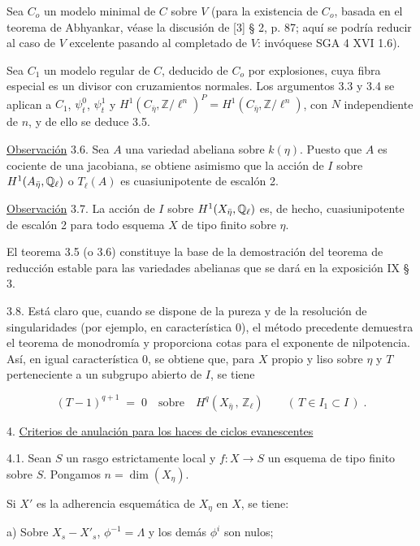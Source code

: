 Sea $C_o$ un modelo minimal de $C$ sobre $V$ (para la existencia de $C_o$, basada en el teorema de Abhyankar, véase la discusión de [3] § 2, p. 87; aquí se podría reducir al caso de $V$ excelente pasando al completado de $V$: invóquese SGA 4 XVI 1.6).

Sea $C_1$ un modelo regular de $C$, deducido de $C_o$ por explosiones, cuya fibra especial es un divisor con cruzamientos normales. Los argumentos 3.3 y 3.4 se aplican a $C_1$, $\psi_t^0$, $\psi_t^1$ y $H^1(C_{\bar\eta},\mathbb{Z}/\ell^n)^P = H^1(C_{\bar\eta},\mathbb{Z}/\ell^n)$, con $N$ independiente de $n$, y de ello se deduce 3.5.

\underline{Observación} 3.6.    Sea $A$ una variedad abeliana sobre $k(\eta)$. Puesto que $A$ es cociente de una jacobiana, se obtiene asimismo que la acción de $I$ sobre $H^1(\sisi{A_\eta}{A_{\bar\eta}},\mathbb{Q}_\ell)$ o $T_\ell(A)$ es cuasiunipotente de escalón 2.

\underline{Observación} 3.7.   La acción de $I$ sobre $H^1(X_{\bar\eta},\sisi{\mathbb{Q}}{\mathbb{Q}_\ell})$ es, de hecho, cuasiunipotente de escalón 2 para todo esquema $X$ de tipo finito sobre $\eta$.

El teorema 3.5 (o 3.6) constituye la base de la demostración del teorema de reducción estable para las variedades abelianas que se dará en la exposición IX § 3.

3.8.   Está claro que, cuando se dispone de la pureza y de la resolución de singularidades (por ejemplo, en característica 0), el método precedente demuestra el teorema de monodromía y proporciona cotas para el exponente de nilpotencia. Así, en igual característica 0, se obtiene que, para $X$ propio y liso sobre $\eta$ y $T$ perteneciente a un subgrupo abierto de $I$, se tiene

\begin{equation*}
(T - 1)^{q+1} \;=\; 0 \quad \text{sobre} \quad H^q(X_{\bar\eta}\,,\, \mathbb{Z}_\ell) \qquad ( \, T \in I_1 \subset I \, ) \; .
\end{equation*}

4. \underline{Criterios de anulación para los haces de ciclos evanescentes}

4.1.  Sean $S$ un rasgo estrictamente local y $f : X \longrightarrow S$ un esquema de tipo finito sobre $S$. Pongamos $n = \dim(X_\eta)$.

Si $X'$ es la adherencia esquemática de $X_\eta$ en $X$, se tiene:

a) Sobre $X_s - X'_s$, $\phi^{-1} = \Lambda$ y los demás $\phi^i$ son nulos;


